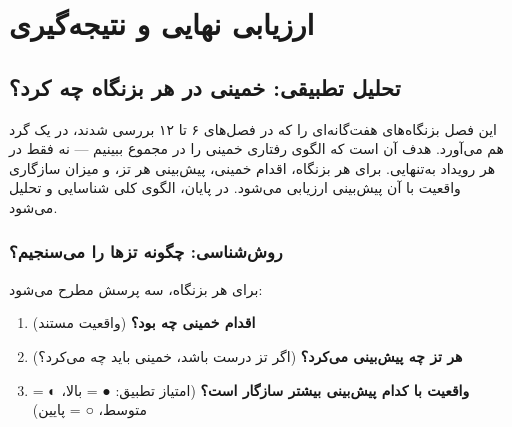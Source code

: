 

\part{ارزیابی نهایی و نتیجه‌گیری}

\chapter{تحلیل تطبیقی: خمینی در هر بزنگاه چه کرد؟}

\begin{infoBox}
این فصل بزنگاه‌های هفت‌گانه‌ای را که در فصل‌های ۶ تا ۱۲ بررسی شدند، در یک  گرد هم می‌آورد. هدف آن است که الگوی رفتاری خمینی را در مجموع ببینیم — نه فقط در هر رویداد به‌تنهایی. برای هر بزنگاه، اقدام خمینی، پیش‌بینی هر تز، و میزان سازگاری واقعیت با آن پیش‌بینی ارزیابی می‌شود. در پایان، الگوی کلی شناسایی و تحلیل می‌شود.
\end{infoBox}

\section{روش‌شناسی: چگونه تزها را می‌سنجیم؟}

\begin{principleBox}
برای هر بزنگاه، سه پرسش مطرح می‌شود:
\begin{enumerate}[label=\textcolor{cPrimary}{\bfseries\arabic*.}, rightmargin=2em]
    \item \textbf{اقدام خمینی چه بود؟} (واقعیت مستند)
    \item \textbf{هر تز چه پیش‌بینی می‌کرد؟} (اگر تز درست باشد، خمینی باید چه می‌کرد؟)
    \item \textbf{واقعیت با کدام پیش‌بینی بیشتر سازگار است؟} (امتیاز تطبیق: ● = بالا، ◐ = متوسط، ○ = پایین)
\end{enumerate}
\end{principleBox}

